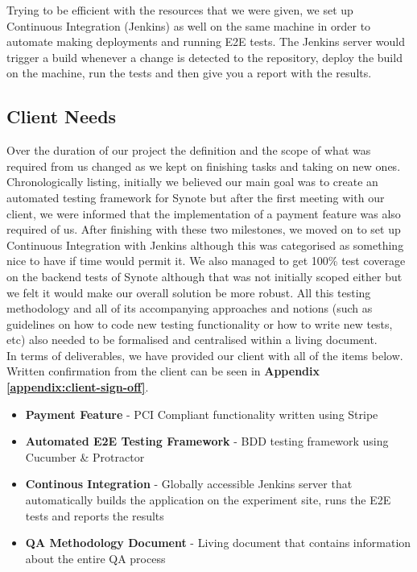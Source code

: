 Trying to be efficient with the resources that we were given, we set up Continuous Integration (Jenkins) as well on the same machine in order to automate making deployments and running E2E tests. The Jenkins server would trigger a build whenever a change is detected to the repository, deploy the build on the machine, run the tests and then give you a report with the results.

\subsection{Client Needs}
\label{subsec:client-needs}

Over the duration of our project the definition and the scope of what was required from us changed as we kept on finishing tasks and taking on new ones. \\

Chronologically listing, initially we believed our main goal was to create an automated testing framework for Synote but after the first meeting with our client, we were informed that the implementation of a payment feature was also required of us. After finishing with these two milestones, we moved on to set up Continuous Integration with Jenkins although this was categorised as something nice to have if time would permit it. We also managed to get 100\% test coverage on the backend tests of Synote although that was not initially scoped either but we felt it would make our overall solution be more robust. All this testing methodology and all of its accompanying approaches and notions (such as guidelines on how to code new testing functionality or how to write new tests, etc) also needed to be formalised and centralised within a living document. \\

In terms of deliverables, we have provided our client with all of the items below. Written confirmation from the client can be seen in \textbf{Appendix \ref{appendix:client-sign-off}}.

\begin{itemize}
    \item \textbf{Payment Feature} - PCI Compliant functionality written using Stripe
    \item \textbf{Automated E2E Testing Framework} - BDD testing framework using Cucumber \& Protractor
    \item \textbf{Continous Integration} - Globally accessible Jenkins server that automatically builds the application on the experiment site, runs the E2E tests and reports the results
    \item \textbf{QA Methodology Document} - Living document that contains information about the entire QA process
\end{itemize}

